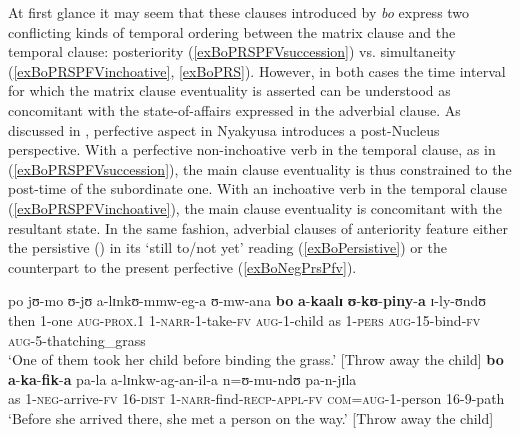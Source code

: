 At first glance it may seem that these clauses introduced by \textit{bo} express two conflicting kinds of temporal ordering between the matrix clause and the temporal clause: posteriority (\ref{exBoPRSPFVsuccession}) vs. simultaneity (\ref{exBoPRSPFVinchoative}, \ref{exBoPRS}). However, in both cases the time interval for which the matrix clause eventuality is asserted can be understood as concomitant with the state-of-affairs expressed in the adverbial clause. As discussed in , perfective aspect in Nyakyusa introduces a post-Nucleus perspective. With a perfective non-inchoative verb in the temporal clause, as in (\ref{exBoPRSPFVsuccession}), the main clause eventuality is thus constrained to the post-time of the subordinate one. With an inchoative verb in the temporal clause (\ref{exBoPRSPFVinchoative}), the main clause eventuality is concomitant with the resultant state. In the same fashion, adverbial clauses of anteriority feature either the persistive () in its \lq still to/not yet' reading (\ref{exBoPersistive}) or the  counterpart to the present perfective (\ref{exBoNegPrsPfv}).
\begin{exe}
\ex \label{exBoPersistive}
\gll po jʊ-mo ʊ-jʊ a-lɪnkʊ-mmw-eg-a ʊ-mw-ana \textbf{bo} \textbf{a}-\textbf{kaalɪ} \textbf{ʊ}-\textbf{kʊ}-\textbf{piny}-\textbf{a} ɪ-ly-ʊndʊ\\
then 1-one \textsc{aug}-\textsc{prox.1} 1-\textsc{narr}-1-take-\textsc{fv} \textsc{aug}-1-child as 1-\textsc{pers} \textsc{aug}-15-bind-\textsc{fv} \textsc{aug}-5-thatching\_grass\\
\sn \lq One of them took her child before binding the grass.' [Throw away the child]
\ex \label{exBoNegPrsPfv}
\gll \textbf{bo} \textbf{a}-\textbf{ka}-\textbf{fik}-\textbf{a} pa-la a-lɪnkw-ag-an-il-a n=ʊ-mu-ndʊ pa-n-jɪla\\
as 1-\textsc{neg}-arrive-\textsc{fv} 16-\textsc{dist} 1-\textsc{narr}-find-\textsc{recp}-\textsc{appl}-\textsc{fv} \textsc{com}=\textsc{aug}-1-person 16-9-path\\
\glt \lq Before she arrived there, she met a person on the way.' [Throw away the child]
\end{exe}

